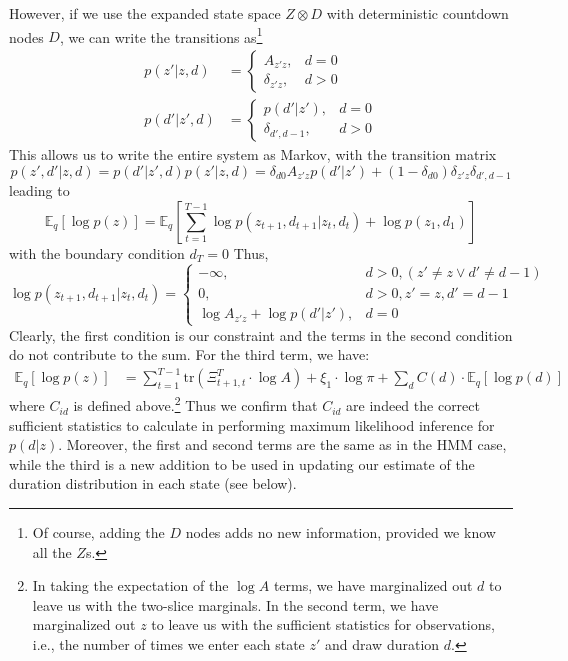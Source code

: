 \documentclass[11pt]{article}
\begin{document}
However, if we use the expanded state space $Z \otimes D$ with deterministic countdown nodes $D$, we can write the transitions as\footnote{Of course, adding the $D$ nodes adds no new information, provided we know all the $Z$s.}
\begin{align}
    p(z'|z, d) &=
        \begin{cases}
            A_{z'z}, & d=0 \\
            \delta_{z'z}, & d > 0
        \end{cases} \\
    p(d'|z', d) &=
        \begin{cases}
            p(d'|z'), & d=0 \\
            \delta_{d', d - 1}, & d > 0
        \end{cases}
\end{align}
This allows us to write the entire system as Markov, with the transition matrix
\begin{equation}
    p(z', d'|z, d) = p(d'|z', d) p(z'|z, d) =
    \delta_{d0} A_{z'z}p(d'|z') + (1 - \delta_{d0}) \delta_{z'z} \delta_{d', d-1}
\end{equation}
leading to
\begin{equation}
    \mathbb{E}_q[\log p(z)] = \mathbb{E}_q\left[
    \sum_{t = 1}^{T - 1} \log p(z_{t + 1}, d_{t + 1}|z_t, d_t) +
    \log p(z_1, d_1)
    \right]
\end{equation}
with the boundary condition $d_T = 0$ Thus,
\begin{equation}
    \log p(z_{t + 1}, d_{t + 1}|z_t, d_t) = 
    \begin{cases}
        -\infty, & d > 0, (z'\neq z \vee d' \neq d - 1) \\
        0, & d > 0, z' = z, d' = d - 1 \\
        \log A_{z'z} + \log p(d'|z'), & d = 0
    \end{cases}
\end{equation}
Clearly, the first condition is our constraint and the terms in the second condition do not contribute to the sum. For the third term, we have: 
\begin{align}
    \mathbb{E}_q[\log p(z)] &= \sum_{t = 1}^{T - 1} 
    \mathrm{tr}(\Xi^T_{t+1, t} \cdot \log A) + \xi_1 \cdot \log \pi + \sum_d C(d) \cdot \mathbb{E}_q[\log p(d)]
\end{align}
where $C_{id}$ is defined above.\footnote{In taking the expectation of the $\log A$ terms, we have marginalized out $d$ to leave us with the two-slice marginals. In the second term, we have marginalized out $z$ to leave us with the sufficient statistics for observations, i.e., the number of times we enter each state $z'$ and draw duration $d$.} Thus we confirm that $C_{id}$ are indeed the correct sufficient statistics to calculate in performing maximum likelihood inference for $p(d|z)$. Moreover, the first and second terms are the same as in the HMM case, while the third is a new addition to be used in updating our estimate of the duration distribution in each state (see below).
\end{document}

